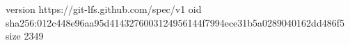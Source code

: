 version https://git-lfs.github.com/spec/v1
oid sha256:012c448e96aa95d4143276003124956144f7994ece31b5a0289040162dd486f5
size 2349
